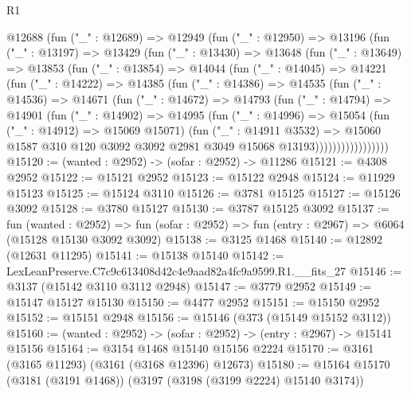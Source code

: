 \begin{lexlean}{R1}
\begin{coremodule}
      @12688
        (fun ("_" : @12689) =>
        @12949
          (fun ("_" : @12950) =>
          @13196
            (fun ("_" : @13197) =>
            @13429
              (fun ("_" : @13430) =>
              @13648
                (fun ("_" : @13649) =>
                @13853
                  (fun ("_" : @13854) =>
                  @14044
                    (fun ("_" : @14045) =>
                    @14221
                      (fun ("_" : @14222) =>
                      @14385
                        (fun ("_" : @14386) =>
                        @14535
                          (fun ("_" : @14536) =>
                          @14671
                            (fun ("_" : @14672) =>
                            @14793
                              (fun ("_" : @14794) =>
                              @14901
                                (fun ("_" : @14902) =>
                                @14995
                                  (fun ("_" : @14996) =>
                                  @15054
                                    (fun ("_" : @14912) => @15069 @15071)
                                    (fun ("_" : @14911 @3532) =>
                                    @15060
                                      @1587
                                      @310
                                      @120
                                      @3092
                                      @3092
                                      @2981
                                      @3049
                                      @15068
                                      @13193)))))))))))))))))
@15120 := (wanted : @2952) -> (sofar : @2952) -> @11286
@15121 := @4308 @2952
@15122 := @15121 @2952
@15123 := @15122 @2948
@15124 := @11929 @15123
@15125 := @15124 @3110
@15126 := @3781 @15125
@15127 := @15126 @3092
@15128 := @3780 @15127
@15130 := @3787 @15125 @3092
@15137 := fun (wanted : @2952) =>
  fun (sofar : @2952) => fun (entry : @2967) => @6064 (@15128 @15130 @3092 @3092)
@15138 := @3125 @1468
@15140 := @12892 (@12631 @11295)
@15141 := @15138 @15140
@15142 := LexLeanPreserve.C7c9c613408d42c4e9aad82a4fc9a9599.R1.__fits_27
@15146 := @3137 (@15142 @3110 @3112 @2948)
@15147 := @3779 @2952
@15149 := @15147 @15127 @15130
@15150 := @4477 @2952
@15151 := @15150 @2952
@15152 := @15151 @2948
@15156 := @15146 (@373 (@15149 @15152 @3112))
@15160 := (wanted : @2952) -> (sofar : @2952) -> (entry : @2967) -> @15141 @15156
@15164 := @3154 @1468 @15140 @15156 @2224
@15170 := @3161 (@3165 @11293) (@3161 (@3168 @12396) @12673)
@15180 := @15164 @15170 (@3181 (@3191 @1468)) (@3197 (@3198 (@3199 @2224) @15140 @3174))

\end{coremodule}
\end{lexlean}
